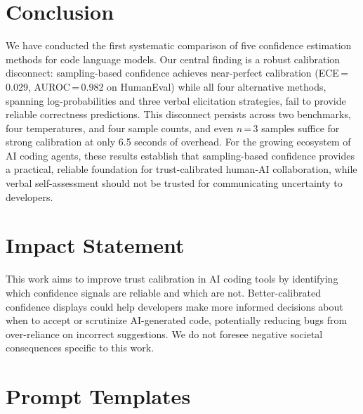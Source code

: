 \documentclass{article}
\begin{document}
\section{Conclusion}
\label{sec:conclusion}

We have conducted the first systematic comparison of five confidence estimation methods for code language models. Our central finding is a robust calibration disconnect: sampling-based confidence achieves near-perfect calibration (ECE\,=\,0.029, AUROC\,=\,0.982 on HumanEval) while all four alternative methods, spanning log-probabilities and three verbal elicitation strategies, fail to provide reliable correctness predictions. This disconnect persists across two benchmarks, four temperatures, and four sample counts, and even $n$\,=\,3 samples suffice for strong calibration at only 6.5 seconds of overhead. For the growing ecosystem of AI coding agents, these results establish that sampling-based confidence provides a practical, reliable foundation for trust-calibrated human-AI collaboration, while verbal self-assessment should not be trusted for communicating uncertainty to developers.

\section*{Impact Statement}
This work aims to improve trust calibration in AI coding tools by identifying which confidence signals are reliable and which are not. Better-calibrated confidence displays could help developers make more informed decisions about when to accept or scrutinize AI-generated code, potentially reducing bugs from over-reliance on incorrect suggestions. We do not foresee negative societal consequences specific to this work.




\newpage
\appendix
\section{Prompt Templates}
\label{app:prompts}
\end{document}
